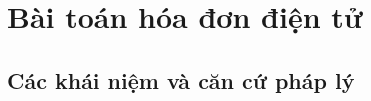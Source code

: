 \documentclass{report} %
\begin{document}
% 
% 
% 
% 
% 
% 
% 
% 
% 
% 
% 
% 
% 
% 
\chapter{Bài toán hóa đơn điện tử}
% 
\section{Các khái niệm và căn cứ pháp lý}
% 
\end{document}

